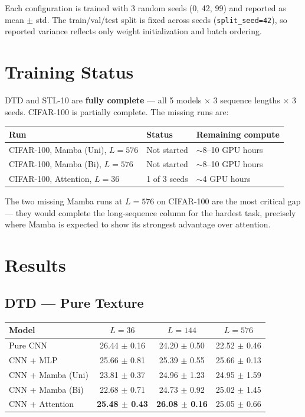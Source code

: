 \documentclass[11pt, a4paper]{article}
\begin{document}
Each configuration is trained with 3 random seeds (0, 42, 99) and reported as
mean $\pm$ std. The train/val/test split is fixed across seeds (\texttt{split\_seed=42}),
so reported variance reflects only weight initialization and batch ordering.

\section{Training Status}

DTD and STL-10 are \textbf{fully complete} — all 5 models $\times$ 3 sequence lengths
$\times$ 3 seeds. CIFAR-100 is partially complete. The missing runs are:

\begin{center}
\begin{tabular}{lll}
\toprule
\textbf{Run} & \textbf{Status} & \textbf{Remaining compute} \\
\midrule
CIFAR-100, Mamba (Uni), $L=576$ & Not started & $\sim$8--10 GPU hours \\
CIFAR-100, Mamba (Bi),  $L=576$ & Not started & $\sim$8--10 GPU hours \\
CIFAR-100, Attention,   $L=36$  & 1 of 3 seeds & $\sim$4 GPU hours \\
\bottomrule
\end{tabular}
\end{center}

The two missing Mamba runs at $L=576$ on CIFAR-100 are the most critical gap —
they would complete the long-sequence column for the hardest task, precisely where
Mamba is expected to show its strongest advantage over attention.

\section{Results}

\subsection{DTD — Pure Texture}

\begin{center}
\begin{tabular}{lccc}
\toprule
\textbf{Model} & $L=36$ & $L=144$ & $L=576$ \\
\midrule
Pure CNN          & 26.44 $\pm$ 0.16 & 24.20 $\pm$ 0.50 & 22.52 $\pm$ 0.46 \\
CNN + MLP         & 25.66 $\pm$ 0.81 & 25.39 $\pm$ 0.55 & 25.66 $\pm$ 0.13 \\
CNN + Mamba (Uni) & 23.81 $\pm$ 0.37 & 24.96 $\pm$ 1.23 & 24.95 $\pm$ 1.59 \\
CNN + Mamba (Bi)  & 22.68 $\pm$ 0.71 & 24.73 $\pm$ 0.92 & 25.02 $\pm$ 1.45 \\
CNN + Attention   & \textbf{25.48 $\pm$ 0.43} & \textbf{26.08 $\pm$ 0.16} & 25.05 $\pm$ 0.66 \\
\bottomrule
\end{tabular}
\end{center}
\end{document}
